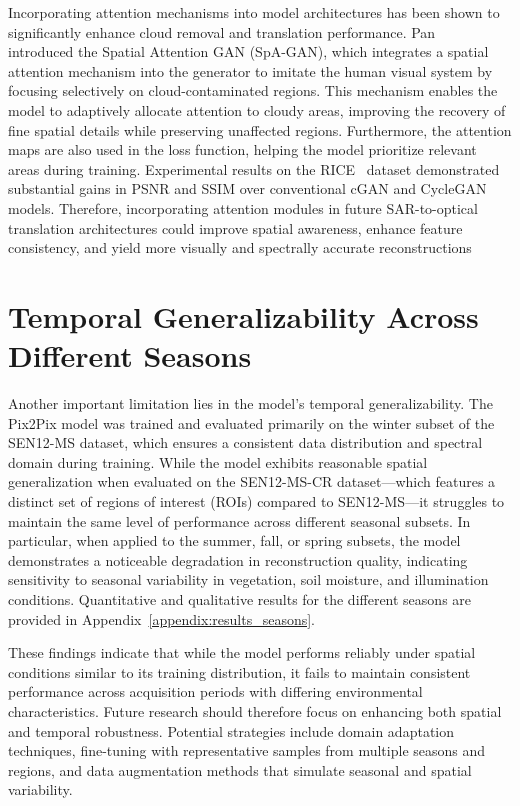 Incorporating attention mechanisms into model architectures has been shown to significantly enhance cloud removal and translation performance. Pan~\cite{CR_RS_spati_atten_GAN} introduced the Spatial Attention GAN (SpA-GAN), which integrates a spatial attention mechanism into the generator to imitate the human visual system by focusing selectively on cloud-contaminated regions. This mechanism enables the model to adaptively allocate attention to cloudy areas, improving the recovery of fine spatial details while preserving unaffected regions. Furthermore, the attention maps are also used in the loss function, helping the model prioritize relevant areas during training. Experimental results on the RICE~\cite{RICE_dataset} dataset demonstrated substantial gains in PSNR and SSIM over conventional cGAN and CycleGAN models. Therefore, incorporating attention modules in future SAR-to-optical translation architectures could improve spatial awareness, enhance feature consistency, and yield more visually and spectrally accurate reconstructions 

\section{Temporal Generalizability Across Different Seasons}
Another important limitation lies in the model’s temporal generalizability. The Pix2Pix model was trained and evaluated primarily on the winter subset of the SEN12-MS dataset, which ensures a consistent data distribution and spectral domain during training. While the model exhibits reasonable spatial generalization when evaluated on the SEN12-MS-CR dataset—which features a distinct set of regions of interest (ROIs) compared to SEN12-MS—it struggles to maintain the same level of performance across different seasonal subsets. In particular, when applied to the summer, fall, or spring subsets, the model demonstrates a noticeable degradation in reconstruction quality, indicating sensitivity to seasonal variability in vegetation, soil moisture, and illumination conditions. Quantitative and qualitative results for the different seasons are provided in Appendix~\ref{appendix:results_seasons}.

These findings indicate that while the model performs reliably under spatial conditions similar to its training distribution, it fails to maintain consistent performance across acquisition periods with differing environmental characteristics. Future research should therefore focus on enhancing both spatial and temporal robustness. Potential strategies include domain adaptation techniques, fine-tuning with representative samples from multiple seasons and regions, and data augmentation methods that simulate seasonal and spatial variability.


